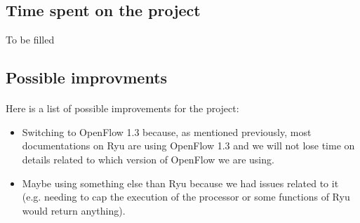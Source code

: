 \documentclass[a4paper, 11pt, oneside]{article}
\begin{document}
\subsection{Time spent on the project}
To be filled

\subsection{Possible improvments}
\paragraph{}Here is a list of possible improvements for the project:
\begin{itemize}
\item Switching to OpenFlow 1.3 because, as mentioned previously, most documentations on Ryu are using OpenFlow 1.3 and we will not lose time on details related to which version of OpenFlow we are using.
\item Maybe using something else than Ryu because we had issues related to it (e.g. needing to cap the execution of the processor or some functions of Ryu would return anything).
\end{itemize}

\end{document}
